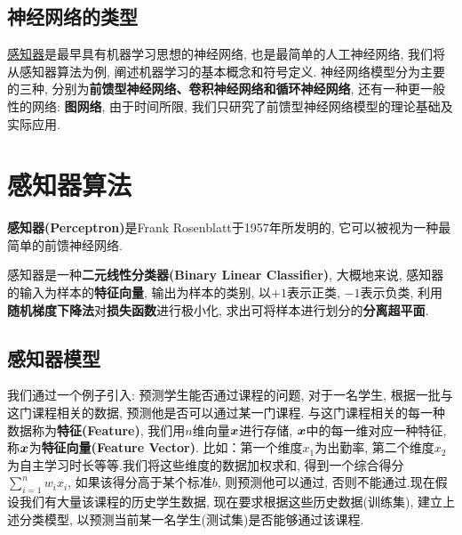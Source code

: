 \documentclass[12pt, a4paper, oneside]{ctexart}
\begin{document}
\subsection{神经网络的类型}

\hyperref[section-感知器算法]{感知器}是最早具有机器学习思想的神经网络, 也是最简单的人工神经网络, 我们将从感知器算法为例, 阐述机器学习的基本概念和符号定义. 神经网络模型分为主要的三种, 分别为\textbf{前馈型神经网络、卷积神经网络和循环神经网络}, 还有一种更一般性的网络: \textbf{图网络}, 由于时间所限, 我们只研究了前馈型神经网络模型的理论基础及实际应用.

\section{感知器算法}\label{section-感知器算法}
\textbf{感知器(Perceptron)}是Frank Rosenblatt于1957年所发明的, 它可以被视为一种最简单的前馈神经网络.

感知器是一种\textbf{二元线性分类器(Binary Linear Classifier)}, 大概地来说, 感知器的输入为样本的\textbf{特征向量}, 输出为样本的类别, 以$+1$表示正类, $-1$表示负类, 利用\textbf{随机梯度下降法}对\textbf{损失函数}进行极小化, 求出可将样本进行划分的\textbf{分离超平面}.
\subsection{感知器模型}
我们通过一个例子引入: 预测学生能否通过课程的问题, 对于一名学生, 根据一批与这门课程相关的数据, 预测他是否可以通过某一门课程. 与这门课程相关的每一种数据称为\textbf{特征(Feature)}, 我们用$n$维向量$\boldsymbol{x}$进行存储, $\boldsymbol{x}$中的每一维对应一种特征, 称$\boldsymbol{x}$为\textbf{特征向量(Feature Vector)}. 比如：第一个维度$x_1$为出勤率, 第二个维度$x_2$为自主学习时长等等.我们将这些维度的数据加权求和, 得到一个综合得分$\sum_{i=1}^nw_ix_i$, 如果该得分高于某个标准$b$, 则预测他可以通过, 否则不能通过.现在假设我们有大量该课程的历史学生数据, 现在要求根据这些历史数据(训练集), 建立上述分类模型, 以预测当前某一名学生(测试集)是否能够通过该课程.
\end{document}
